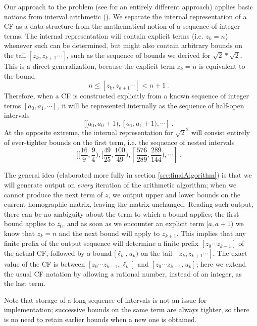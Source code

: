 \documentclass[11pt, oneside]{amsart}   	%
\renewcommand{\:}{\negthickspace:\negthickspace}
\begin{document}
Our approach to the problem (see \cite{Lester01} for an entirely different approach)
applies basic notions from interval arithmetic (\cite{doi:10.1137/1.9780898717716,Mayer+2017}).
We separate the internal representation of a CF as a data structure from the mathematical notion of a  sequence of integer terms. The
internal representation will contain explicit terms (i.e. $z_k=n$) whenever such can be determined, but might also contain arbitrary
bounds on the tail $[z_k, z_{k+1}\cdots]$, such as the  sequence of bounds we derived for $\sqrt{2}*\sqrt{2}$. This is a direct
generalization, because the explicit term  $z_k=n$ is equivalent to the bound 
\[
n \leq [z_k, z_{k+1}\cdots] < n+1 \ .
\]
Therefore, when a CF is constructed explicitly from a known sequence of integer terms $[a_0, a_1, \cdots]$,
it will be represented internally as the sequence of half-open intervals
\[
[[a_0, a_0+1),  [a_1, a_1+1), \cdots]\ .
\] 
At the opposite extreme, the internal representation for $\sqrt{2}^2$ will consist entirely of ever-tighter bounds on the first term, i.e. the sequence of nested intervals
\[
[[\frac{16}{9},\frac{9}{4}), [\frac{49}{25},\frac{100}{49}), [\frac{576}{289},\frac{289}{144}), \cdots]\ .
\] 

The general idea (elaborated more fully in section \ref{sec:finalAlgorithm}) is that we will generate output on \emph{every}
 iteration of the arithmetic algorithm; when we cannot produce the next term of $z$, we output upper and lower bounds on the current
 homographic matrix, leaving the matrix unchanged. Reading such output, there can be no ambiguity about the term to which a bound 
 applies; the first bound applies to $z_0$, and as soon as we encounter an explicit term $[a,a+1)$ we know that $z_k=n$ and the next bound will apply to $z_{k+1}$. 
 This implies that any finite prefix of the output sequence will determine a finite prefix $[z_0 \cdots z_{k-1}]$ of the actual CF, followed by a bound
 $[\ell_k,u_k)$ on the tail $[z_k, z_{k+1}\cdots]$. The exact value of the CF is between $[z_0 \cdots z_{k-1}, \ell_k]$ and
 $[z_0 \cdots z_{k-1}, u_k]$; here we extend the usual CF notation by allowing a rational number, instead of an integer, as the last term.

Note that storage of a long sequence of intervals is not an issue for implementation;
successive bounds on the same term are always tighter, so there is no need to retain earlier bounds when a new one is obtained. 
\end{document}
